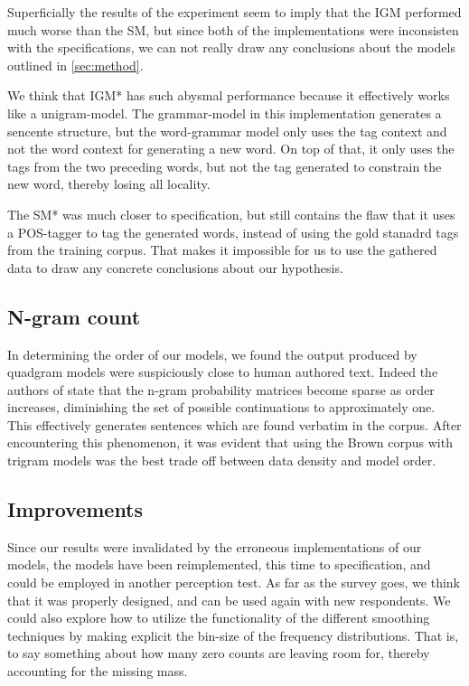 \documentclass[ai15_group61_report.tex]{subfiles}
\begin{document}
Superficially the results of the experiment seem to imply that the IGM performed much worse than the SM, but since both of the implementations were inconsisten with the specifications, we can not really draw any conclusions about the models outlined in \ref{sec:method}.

We think that IGM* has such abysmal performance because it effectively works like a unigram-model. The grammar-model in this implementation generates a sencente structure, but the word-grammar model only uses the tag context and not the word context for generating a new word. On top of that, it only uses the tags from the two preceding words, but not the tag generated to constrain the new word, thereby losing all locality.

The SM* was much closer to specification, but still contains the flaw that it uses a POS-tagger to tag the generated words, instead of using the gold stanadrd tags from the training corpus. That makes it impossible for us to use the gathered data to draw any concrete conclusions about our hypothesis. 


\subsection{N-gram count}
In determining the order of our models, we found the output produced by quadgram models were suspiciously close to human authored text. Indeed the authors of \cite{Jurafsky2000} state that the n-gram probability matrices become sparse as order increases, diminishing the set of possible continuations to approximately one. This effectively generates sentences which are found verbatim in the corpus. After encountering this phenomenon, it was evident that using the Brown corpus with trigram models was the best trade off between data density and model order.  

\subsection{Improvements}
Since our results were invalidated by the erroneous implementations of our models, the models have been reimplemented, this time to specification, and could be employed in another perception test. As far as the survey goes, we think that it was properly designed, and can be used again with new respondents. We could also explore how to utilize the functionality of the different smoothing techniques by making explicit the bin-size of the frequency distributions. That is, to say something about how many zero counts are leaving room for, thereby accounting for the missing mass.
\end{document}
